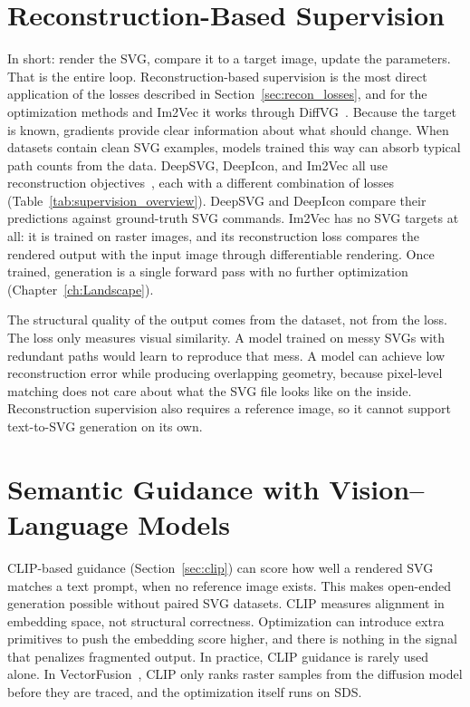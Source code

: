 \section{Reconstruction-Based Supervision}
\label{sec:recon_supervision}

In short: render the SVG, compare it to a target image, update the parameters. 
That is the entire loop. Reconstruction-based supervision is the most 
direct application of the losses described in Section~\ref{sec:recon_losses}, 
and for the optimization methods and Im2Vec it works through DiffVG~\cite{liDifferentiableVectorGraphics2020a}.
Because the target is known, gradients provide clear information about what should change. 
When datasets contain clean SVG examples, models trained this way can absorb typical path 
counts from the data. DeepSVG, DeepIcon, and Im2Vec all use reconstruction 
objectives~\cite{carlierDeepSVGHierarchicalGenerative2020, bingDeepIconHierarchicalNetwork2024, reddyIm2VecSynthesizingVector2021}, 
each with a different combination of losses (Table~\ref{tab:supervision_overview}). 
DeepSVG and DeepIcon compare their predictions against ground-truth SVG commands. 
Im2Vec has no SVG targets at all: it is trained on raster images, and its reconstruction loss 
compares the rendered output with the input image through differentiable rendering. 
Once trained, generation is a single forward pass with no further optimization (Chapter~\ref{ch:Landscape}).

The structural quality of the output comes from the dataset, not from the loss. 
The loss only measures visual similarity. A model trained on messy SVGs with redundant 
paths would learn to reproduce that mess. A model can achieve low 
reconstruction error while producing overlapping geometry, 
because pixel-level matching does not care about what the SVG file looks like on the inside. 
Reconstruction supervision also requires a reference image, so it cannot support text-to-SVG generation on its own.


\section{Semantic Guidance with Vision--Language Models}
\label{sec:clip_guidance}

CLIP-based guidance (Section~\ref{sec:clip}) can score how well a rendered SVG matches a text prompt, when no reference image exists. 
This makes open-ended generation possible without paired SVG datasets.
CLIP measures alignment in embedding space, not structural correctness. 
Optimization can introduce extra primitives to push the embedding score higher, 
and there is nothing in the signal that penalizes fragmented output. 
In practice, CLIP guidance is rarely used alone. In VectorFusion~\cite{jainVectorFusionTexttoSVGAbstracting2022}, 
CLIP only ranks raster samples from the diffusion model before they are traced, 
and the optimization itself runs on SDS.



